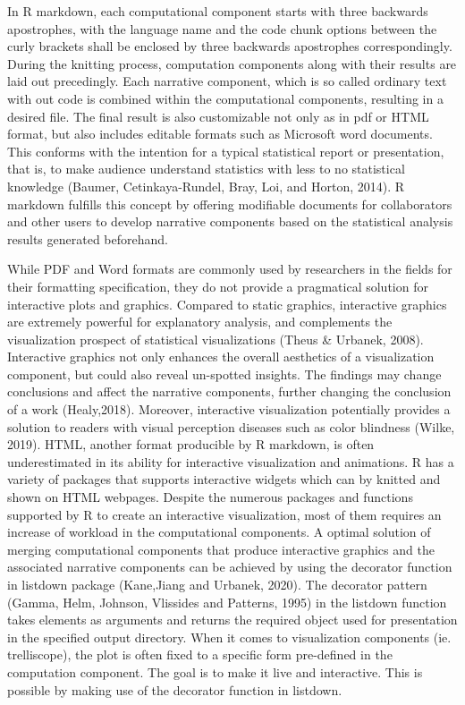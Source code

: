 \documentclass[
]{article}
\begin{document}
In R markdown, each computational component starts with three backwards
apostrophes, with the language name and the code chunk options between
the curly brackets shall be enclosed by three backwards apostrophes
correspondingly. During the knitting process, computation components
along with their results are laid out precedingly. Each narrative
component, which is so called ordinary text with out code is combined
within the computational components, resulting in a desired file. The
final result is also customizable not only as in pdf or HTML format, but
also includes editable formats such as Microsoft word documents. This
conforms with the intention for a typical statistical report or
presentation, that is, to make audience understand statistics with less
to no statistical knowledge (Baumer, Cetinkaya-Rundel, Bray, Loi, and
Horton, 2014). R markdown fulfills this concept by offering modifiable
documents for collaborators and other users to develop narrative
components based on the statistical analysis results generated
beforehand.

While PDF and Word formats are commonly used by researchers in the
fields for their formatting specification, they do not provide a
pragmatical solution for interactive plots and graphics. Compared to
static graphics, interactive graphics are extremely powerful for
explanatory analysis, and complements the visualization prospect of
statistical visualizations (Theus \& Urbanek, 2008). Interactive
graphics not only enhances the overall aesthetics of a visualization
component, but could also reveal un-spotted insights. The findings may
change conclusions and affect the narrative components, further changing
the conclusion of a work (Healy,2018). Moreover, interactive
visualization potentially provides a solution to readers with visual
perception diseases such as color blindness (Wilke, 2019). HTML, another
format producible by R markdown, is often underestimated in its ability
for interactive visualization and animations. R has a variety of
packages that supports interactive widgets which can by knitted and
shown on HTML webpages. Despite the numerous packages and functions
supported by R to create an interactive visualization, most of them
requires an increase of workload in the computational components. A
optimal solution of merging computational components that produce
interactive graphics and the associated narrative components can be
achieved by using the decorator function in listdown package (Kane,Jiang
and Urbanek, 2020). The decorator pattern (Gamma, Helm, Johnson,
Vlissides and Patterns, 1995) in the listdown function takes elements as
arguments and returns the required object used for presentation in the
specified output directory. When it comes to visualization components
(ie. trelliscope), the plot is often fixed to a specific form
pre-defined in the computation component. The goal is to make it live
and interactive. This is possible by making use of the decorator
function in listdown.
\end{document}
